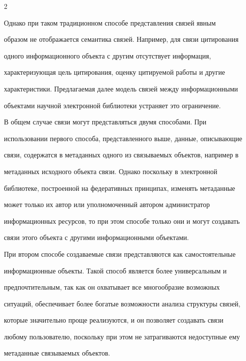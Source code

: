 \begin{multicols}{2}
{}


  


  Однако при таком традиционном способе представления связей явным 


образом не отображается семантика связей. Например, для связи цитирования 


одного информационного объекта с другим отсутствует информация, 


характеризующая цель цитирования, оценку цитируемой работы и другие 


характеристики. Предлагаемая далее модель связей между информационными 


объектами научной электронной библиотеки устраняет это ограничение.


  


  В общем случае связи могут представляться двумя способами. При 


использовании первого способа, представленного выше, данные, описывающие 


связи, содержатся в метаданных одного из связываемых объектов, например в 


метаданных исходного объекта связи. Однако поскольку в электронной 


библиотеке, построенной на федеративных принципах, изменять метаданные 


может только их автор или уполномоченный автором администратор 


информационных ресурсов, то при этом способе только они и могут создавать 


связи этого объекта с другими информационными объектами. 


  


  При втором способе создаваемые связи представляются как самостоятельные 


информационные объекты. Такой способ является более универсальным и 


предпочтительным, так как он охватывает все многообразие возможных 


ситуаций, обеспечивает более богатые возможности анализа структуры связей, 


которые значительно проще реализуются, и он позволяет создавать связи 


любому пользователю, поскольку при этом не затрагиваются недоступные ему 


метаданные связываемых объектов. 



\end{multicols}
